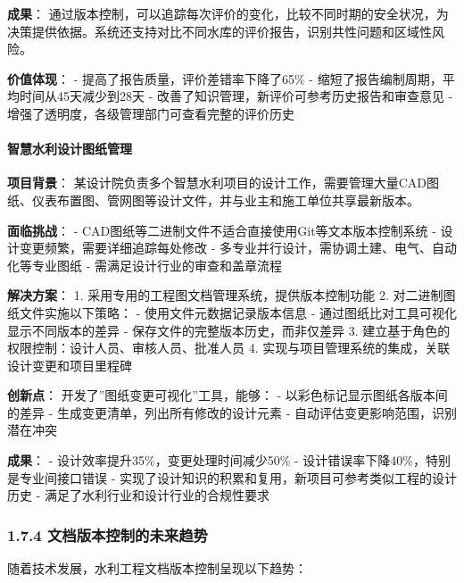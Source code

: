 \textbf{成果}：
通过版本控制，可以追踪每次评价的变化，比较不同时期的安全状况，为决策提供依据。系统还支持对比不同水库的评价报告，识别共性问题和区域性风险。

\textbf{价值体现}： - 提高了报告质量，评价差错率下降了65\% -
缩短了报告编制周期，平均时间从45天减少到28天 -
改善了知识管理，新评价可参考历史报告和审查意见 -
增强了透明度，各级管理部门可查看完整的评价历史

\paragraph{智慧水利设计图纸管理}\label{ux667aux6167ux6c34ux5229ux8bbeux8ba1ux56feux7eb8ux7ba1ux7406}

\textbf{项目背景}：
某设计院负责多个智慧水利项目的设计工作，需要管理大量CAD图纸、仪表布置图、管网图等设计文件，并与业主和施工单位共享最新版本。

\textbf{面临挑战}： -
CAD图纸等二进制文件不适合直接使用Git等文本版本控制系统 -
设计变更频繁，需要详细追踪每处修改 -
多专业并行设计，需协调土建、电气、自动化等专业图纸 -
需满足设计行业的审查和盖章流程

\textbf{解决方案}： 1. 采用专用的工程图文档管理系统，提供版本控制功能 2.
对二进制图纸文件实施以下策略： - 使用文件元数据记录版本信息 -
通过图纸比对工具可视化显示不同版本的差异 -
保存文件的完整版本历史，而非仅差异 3.
建立基于角色的权限控制：设计人员、审核人员、批准人员 4.
实现与项目管理系统的集成，关联设计变更和项目里程碑

\textbf{创新点}： 开发了''图纸变更可视化''工具，能够： -
以彩色标记显示图纸各版本间的差异 - 生成变更清单，列出所有修改的设计元素
- 自动评估变更影响范围，识别潜在冲突

\textbf{成果}： - 设计效率提升35\%，变更处理时间减少50\% -
设计错误率下降40\%，特别是专业间接口错误 -
实现了设计知识的积累和复用，新项目可参考类似工程的设计历史 -
满足了水利行业和设计行业的合规性要求

\subsubsection{1.7.4
文档版本控制的未来趋势}\label{ux6587ux6863ux7248ux672cux63a7ux5236ux7684ux672aux6765ux8d8bux52bf}

随着技术发展，水利工程文档版本控制呈现以下趋势：


